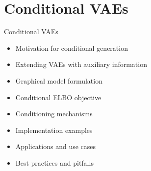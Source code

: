 \documentclass[5pt,aspectratio=169]{beamer}
\begin{document}
\section{Conditional VAEs}


\begin{frame}{Conditional VAEs}
\begin{itemize}
\item Motivation for conditional generation
\item Extending VAEs with auxiliary information
\item Graphical model formulation
\item Conditional ELBO objective
\item Conditioning mechanisms
\item Implementation examples
\item Applications and use cases
\item Best practices and pitfalls
\end{itemize}

\begin{center}
\end{center}
\end{frame}
\end{document}
